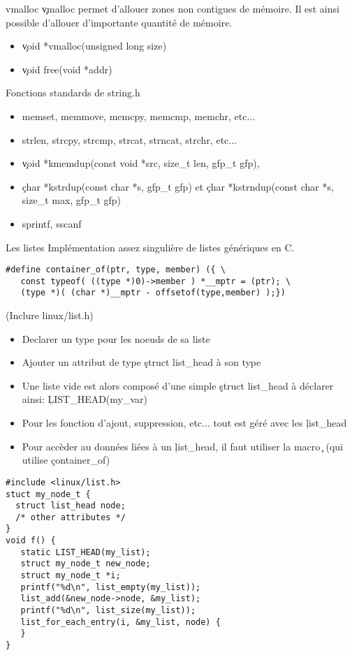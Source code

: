 \begin{frame}{vmalloc}
\c{vmalloc} permet d'allouer zones non contigues de mémoire. Il est ainsi possible d'allouer d'importante quantité de mémoire.

\begin{itemize} 
\item \c{void *vmalloc(unsigned long size)}
\item \c{void free(void *addr)}
\end{itemize} 

\end{frame} 

\begin{frame}{Fonctions standards de string.h}
\begin{itemize} 
\item memset, memmove, memcpy, memcmp, memchr, etc...
\item strlen, strcpy, strcmp, strcat, strncat, strchr, etc...
\item  \c{void  *kmemdup(const void  *src,  size_t  len, gfp_t  gfp)},
\item \c{char *kstrdup(const char   *s,   gfp_t   gfp)}   et   \c{char
    *kstrndup(const char *s, size_t max, gfp_t gfp)}
\item sprintf, sscanf
\end{itemize} 
\end{frame} 

\begin{frame}{Les listes}
Implémentation assez singulière de listes génériques en C. 
\begin{lstlisting} 
#define container_of(ptr, type, member) ({ \ 
   const typeof( ((type *)0)->member ) *__mptr = (ptr); \
   (type *)( (char *)__mptr - offsetof(type,member) );})
\end{lstlisting} 
(Inclure linux/list.h)
\begin{itemize}
\item Declarer un type pour les noeuds de sa liste
\item Ajouter un attribut de type \c{struct list_head} à son type
\item Une liste vide est alors composé d'une simple \c{struct list_head} à déclarer ainsi: \c{LIST_HEAD(my_var)}
\item Pour les fonction d'ajout, suppression, etc... tout est géré avec les \c{list_head}
\item Pour accèder au données liées à un \c{list_head}, il faut utiliser la macro \c{} (qui utilise \c{container_of})
\end{itemize} 
\begin{lstlisting}
#include <linux/list.h>
stuct my_node_t {
  struct list_head node;
  /* other attributes */
}
void f() {
   static LIST_HEAD(my_list);
   struct my_node_t new_node; 
   struct my_node_t *i; 
   printf("%d\n", list_empty(my_list));
   list_add(&new_node->node, &my_list);
   printf("%d\n", list_size(my_list));
   list_for_each_entry(i, &my_list, node) {
   }
} 
\end{lstlisting} 
\end{frame} 

